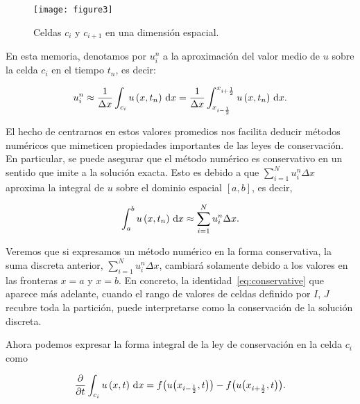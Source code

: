 \begin{figure}[ht!]
  \centering
  \texttt{[image: figure3]}
  \caption{Celdas $c_{i}$ y $c_{i+1}$ en una dimensión espacial.}
  \label{fig:cellsunidimensional}
\end{figure}

En esta memoria, denotamos por $u^{n}_{i}$ a la aproximación del
valor medio de $u$ sobre la celda $c_{i}$ en el tiempo $t_{n}$, es
decir:

\begin{equation*}
  u^{n}_{i}\approx
  \frac{1}{\Delta x}
  \int_{c_{i}}
  u\left(x,t_{n}\right)\dl x=
  \frac{1}{\Delta x}
  \int_{x_{i-\frac{1}{2}}}^{x_{i+\frac{1}{2}}}
  u\left(x,t_{n}\right)\dl x.
\end{equation*}

El hecho de centrarnos en estos valores promedios nos facilita
deducir métodos numéricos que mimeticen propiedades importantes de
las leyes de conservación.
En particular, se puede asegurar que el método numérico es
conservativo en un sentido que imite a la solución exacta.
Esto es debido a que
\begin{math}
  \sum_{i=1}^{N}
  u^{n}_{i}
  \Delta x
\end{math}
aproxima la integral de $u$ sobre el dominio espacial
$\left[a,b\right]$, es decir,

\begin{equation*}
  \int_{a}^{b}
  u\left(x,t_{n}\right)
  \dl x\approx
  \sum_{i=1}^{N}
  u^{n}_{i}
  \Delta x.
\end{equation*}

Veremos que si expresamos un método numérico en la forma
conservativa, la suma discreta anterior,
\begin{math}
  \sum_{i=1}^{N}
  u^{n}_{i}
  \Delta x
\end{math},
cambiará solamente debido a
los valores en las fronteras $x=a$ y $x=b$.
En concreto, la identidad~\eqref{eq:conservative} que aparece más
adelante, cuando el rango de valores de celdas definido por $I$, $J$
recubre toda la partición, puede interpretarse como la conservación
de la solución discreta.

Ahora podemos expresar la forma integral de la ley de conservación en
la celda $c_{i}$ como

\begin{equation}\label{eq:integralformcell}
  \diffp{}{t}
  \int_{c_{i}}
  u\left(x,t\right)\dl x=
  f\big(u\big(x_{i-\frac{1}{2}},t\big)\big)-
  f\big(u\big(x_{i+\frac{1}{2}},t\big)\big).
\end{equation}

